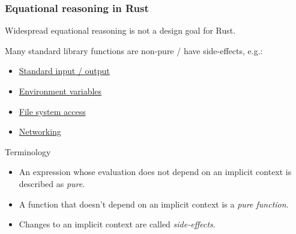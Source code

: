 \documentclass[t]{beamer}
\begin{document}
\begin{frame}
\frametitle{Equational reasoning in Rust}
Widespread equational reasoning is not a design goal for Rust.

\medskip

Many standard library functions are non-pure / have side-effects, e.g.:

\begin{itemize}
\item \href{https://doc.rust-lang.org/std/io/index.html}{Standard input / output}
\item \href{https://doc.rust-lang.org/std/env/index.html}{Environment variables}
\item \href{https://doc.rust-lang.org/stable/std/fs/index.html}{File system access}
\item \href{https://doc.rust-lang.org/std/net/index.html}{Networking}
\end{itemize}

\begin{block}{Terminology}
\begin{itemize}
\item An expression whose evaluation does not depend on an implicit context is described
as \emph{pure}.

\item A function that doesn't depend on an implicit context is a \emph{pure function}.

\item Changes to an implicit context are called \emph{side-effects}.
\end{itemize}
\end{block}

\end{frame}
\end{document}
